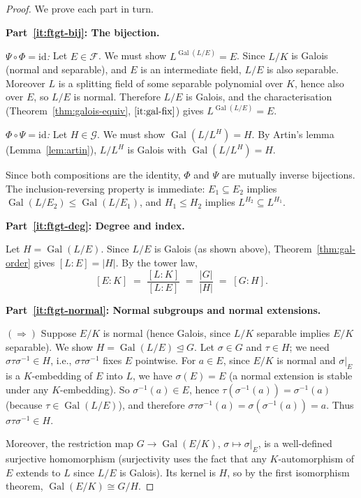 \documentclass[12pt,a4paper,openany]{book}
\theoremstyle{definition}
\theoremstyle{remark}
\DeclareMathOperator{\Gal}{Gal}
\begin{document}
\begin{proof}
We prove each part in turn.

\medskip\noindent
\textbf{Part~\ref{it:ftgt-bij}: The bijection.}

\smallskip\noindent
\emph{$\Psi\circ\Phi=\mathrm{id}$:}\;
Let $E\in\mathcal{F}$.  We must show $L^{\Gal(L/E)}=E$.  Since $L/K$ is
Galois (normal and separable), and $E$ is an intermediate field, $L/E$ is
also separable.  Moreover $L$ is a splitting field of some separable
polynomial over $K$, hence also over $E$, so $L/E$ is normal.  Therefore
$L/E$ is Galois, and the characterisation
(Theorem~\ref{thm:galois-equiv},
$\ref{it:gal-fix}$) gives $L^{\Gal(L/E)}=E$.

\smallskip\noindent
\emph{$\Phi\circ\Psi=\mathrm{id}$:}\;
Let $H\in\mathcal{G}$.  We must show $\Gal(L/L^{H})=H$.  By Artin's lemma
(Lemma~\ref{lem:artin}), $L/L^{H}$ is Galois with
$\Gal(L/L^{H})=H$.

\smallskip
Since both compositions are the identity, $\Phi$ and $\Psi$ are mutually
inverse bijections.  The inclusion-reversing property is immediate:
$E_{1}\subseteq E_{2}$ implies $\Gal(L/E_{2})\leq\Gal(L/E_{1})$, and
$H_{1}\leq H_{2}$ implies $L^{H_{2}}\subseteq L^{H_{1}}$.

\medskip\noindent
\textbf{Part~\ref{it:ftgt-deg}: Degree and index.}

\smallskip
Let $H=\Gal(L/E)$.  Since $L/E$ is Galois (as shown above),
Theorem~\ref{thm:gal-order} gives $[L:E]=|H|$.  By the tower law,
\[
  [E:K] \;=\; \frac{[L:K]}{[L:E]} \;=\; \frac{|G|}{|H|}
  \;=\; [G:H].
\]

\medskip\noindent
\textbf{Part~\ref{it:ftgt-normal}: Normal subgroups and normal extensions.}

\smallskip\noindent
$(\Longrightarrow)$\;
Suppose $E/K$ is normal (hence Galois, since $L/K$ separable implies $E/K$
separable).  We show $H=\Gal(L/E)\trianglelefteq G$.  Let $\sigma\in G$
and $\tau\in H$; we need $\sigma\tau\sigma^{-1}\in H$, i.e.,
$\sigma\tau\sigma^{-1}$ fixes $E$ pointwise.  For $a\in E$, since $E/K$ is
normal and $\sigma|_{E}$ is a $K$-embedding of $E$ into $L$, we have
$\sigma(E)=E$ (a normal extension is stable under any $K$-embedding).
So $\sigma^{-1}(a)\in E$, hence $\tau(\sigma^{-1}(a))=\sigma^{-1}(a)$
(because $\tau\in\Gal(L/E)$), and therefore
$\sigma\tau\sigma^{-1}(a)=\sigma(\sigma^{-1}(a))=a$.  Thus
$\sigma\tau\sigma^{-1}\in H$.

Moreover, the restriction map $G\to\Gal(E/K)$, $\sigma\mapsto\sigma|_{E}$,
is a well-defined surjective homomorphism (surjectivity uses the fact that
any $K$-automorphism of $E$ extends to $L$ since $L/E$ is Galois).  Its
kernel is $H$, so by the first isomorphism theorem,
$\Gal(E/K)\cong G/H$.


\end{proof}
\end{document}
